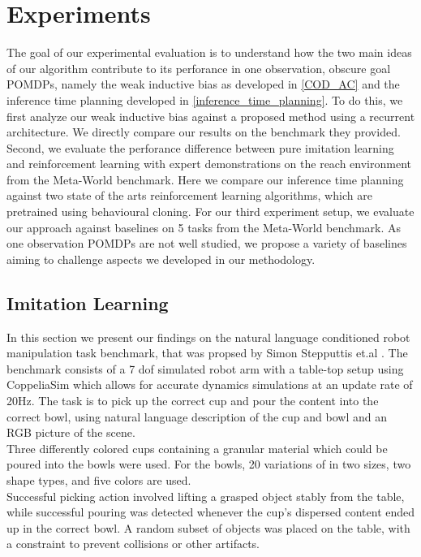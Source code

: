 
\chapter{Experiments}
\label{chapter:Experiments}
The goal of our experimental evaluation is to understand how the two main ideas of our algorithm contribute to its perforance in one observation, obscure goal 
POMDPs, namely the weak inductive bias as developed in \ref{COD_AC} and the inference time planning developed in \ref{inference_time_planning}. 
To do this, we first analyze our weak inductive bias against a proposed method using a recurrent architecture. 
We directly compare our results on the benchmark they provided. Second, we evaluate the perforance difference between pure imitation learning and reinforcement 
learning with expert demonstrations on the reach environment from the Meta-World benchmark. Here we compare our inference time planning against two state of 
the arts reinforcement learning algorithms, which are pretrained using behavioural cloning. For our third experiment setup, we evaluate our approach against 
baselines on 5 tasks from the Meta-World benchmark. As one observation POMDPs are not well studied, we propose a variety of  
baselines aiming to challenge aspects we developed in our methodology.


\section{Imitation Learning}
In this section we present our findings on the natural language conditioned robot manipulation task benchmark, that was propsed by Simon Stepputtis et.al 
\cite{stepputtis2020languageconditioned}. The benchmark consists of a 7 dof simulated robot arm with a table-top setup using CoppeliaSim which allows 
for accurate dynamics simulations at an update rate of 20Hz. The task is to pick up the correct cup and pour the content into the correct bowl, using 
natural language description of the cup and bowl and an RGB picture of the scene.\\
Three differently colored cups containing a granular material which could be poured into the bowls were used. For the bowls, 20 variations of in two sizes, 
two shape types, and five colors are used.\\
Successful picking action involved lifting a grasped object stably from the table, while successful pouring was detected whenever the cup's dispersed 
content ended up in the correct bowl. A random subset of objects was placed on the table, with a constraint to prevent collisions or other artifacts. 


